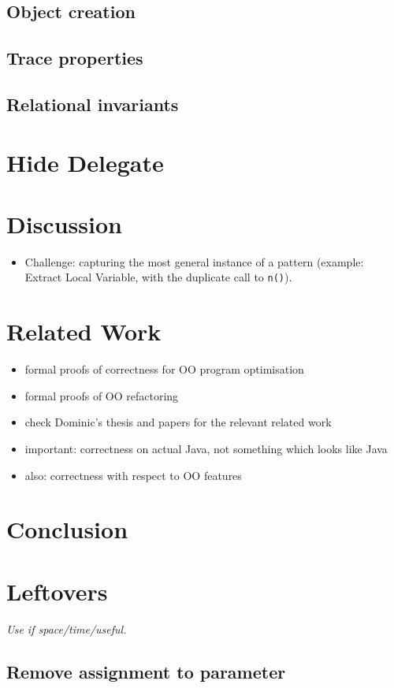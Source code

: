 \documentclass[runningheads]{llncs}
\begin{document}

\subsection{Object creation}\label{sec:objectcreation}


\subsection{Trace properties}


\subsection{Relational invariants}


\section{Hide Delegate}\label{sec:hide}

\section{Discussion}\label{sec:discussion}
\begin{itemize}
\item Challenge: capturing the most general instance of a pattern (example: Extract Local Variable, with the duplicate call to \texttt{n()}).
\end{itemize}

\section{Related Work}\label{sec:related}


\begin{itemize}
\item formal proofs of correctness for OO program optimisation
\item formal proofs of OO refactoring
\item check Dominic's thesis and papers for the relevant related work
\item important: correctness on actual Java, not something which looks like Java
\item also: correctness with respect to OO features
\end{itemize}

\section{Conclusion}\label{sec:conclusion}

%

\section{Leftovers}
\textit{Use if space/time/useful.}
\subsection{Remove assignment to parameter}




\end{document}
